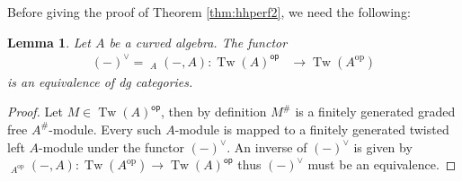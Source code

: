 \documentclass[a4paper]{amsart}
\theoremstyle{plain}
\newtheorem{lem}[thm]{Lemma}
\theoremstyle{definition}
\theoremstyle{remark}
\DeclareMathOperator{\Homdg}{\underline{Hom}}
\DeclareMathOperator{\Tw}{Tw}
\newcommand{\op}{\mathrm{op}}
\newcommand{\cop}{\mathsf{op}}
\numberwithin{equation}{section}
\theoremstyle{plain}
\begin{document}
	Before giving the proof of Theorem \ref{thm:hhperf2}, we need the following:
	\begin{lem}
		Let $A$ be a curved algebra. The functor
		\begin{align*}
			(-)^\vee=\Homdg_{A}(-,A):\Tw(A)^\cop&\to \Tw(A^\op)
		\end{align*}
		is an equivalence of dg categories. 
	\end{lem}
	\begin{proof}
		Let $M\in \Tw(A)^\cop$, then by definition $M^\#$ is a finitely generated graded free $A^\#$-module. Every such $A$-module is mapped to a finitely generated twisted left $A$-module under the functor $(-)^\vee$. An inverse of $(-)^\vee$ is given by $\Homdg_{A^\op}(-,A): \Tw(A^\op)\to \Tw(A)^\cop$ thus $(-)^\vee$ must be an equivalence. 
	\end{proof}
\end{document}
